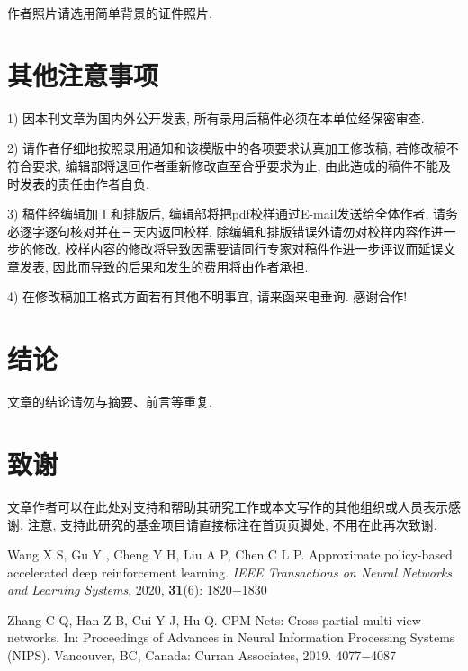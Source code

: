 \documentclass{aas}
\begin{document}
\begin{multicols}{2}
作者照片请选用简单背景的证件照片.


\section{其他注意事项}

1) 因本刊文章为国内外公开发表, 所有录用后稿件必须在本单位经保密审查.

2) 请作者仔细地按照录用通知和该模版中的各项要求认真加工修改稿, 若修改稿不符合要求, 编辑部将退回作者重新修改直至合乎要求为止,  由此造成的稿件不能及时发表的责任由作者自负.

3) 稿件经编辑加工和排版后, 编辑部将把pdf校样通过E-mail发送给全体作者, 请务必逐字逐句核对并在三天内返回校样. 除编辑和排版错误外请勿对校样内容作进一步的修改. 校样内容的修改将导致因需要请同行专家对稿件作进一步评议而延误文章发表, 因此而导致的后果和发生的费用将由作者承担.

4) 在修改稿加工格式方面若有其他不明事宜, 请来函来电垂询. 感谢合作!

\section{结论}

文章的结论请勿与摘要、前言等重复.

\section*{致谢}

文章作者可以在此处对支持和帮助其研究工作或本文写作的其他组织或人员表示感谢.
注意, 支持此研究的基金项目请直接标注在首页页脚处, 不用在此再次致谢.

\begin{thebibliography}{99}
 \addtolength{\itemsep}{0.2em} 
 Wang X S, Gu Y , Cheng Y H, Liu A P, Chen C L P. Approximate policy-based accelerated deep reinforcement learning. {\sl IEEE Transactions on Neural Networks and Learning Systems}, 2020, {\bf 31}(6): 1820$-$1830

 Zhang C Q, Han Z B, Cui Y J, Hu Q. CPM-Nets: Cross partial multi-view networks. In: Proceedings of Advances in Neural Information Processing Systems (NIPS). Vancouver, BC, Canada: Curran Associates, 2019. 4077$-$4087


\end{thebibliography}
\end{multicols}
\end{document}
